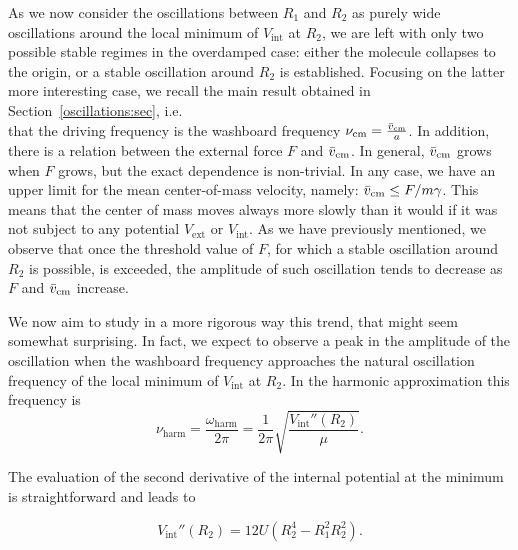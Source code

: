 
As we now consider the oscillations between $R_1$ and $R_2$ as purely wide oscillations around the local minimum of $V_\text{int}$ at $R_2$, we are left with only two possible stable regimes in the overdamped case: either the molecule collapses to the origin, or a stable oscillation around $R_2$ is established. Focusing on the latter more interesting case, we recall the main result obtained in Section~\ref{oscillations:sec}, i.e.\\ that the driving frequency is the washboard frequency $\nu_\text{cm} = \frac{\Bar{v}_\text{cm}}{a}$. In addition, there is a relation between the external force $F$ and $\Bar{v}_\text{cm}$. In general, $\Bar{v}_\text{cm}$ grows when $F$ grows, but the exact dependence is non-trivial. In any case, we have an upper limit for the mean center-of-mass velocity, namely: $\Bar{v}_\text{cm} \leq F/m\gamma$. This means that the center of mass moves always more slowly than it would if it was not subject to any potential $V_\text{ext}$ or $V_\text{int}$. As we have previously mentioned, we observe that once the threshold value of $F$, for which a stable oscillation around $R_2$ is possible, is exceeded, the amplitude of such oscillation tends to decrease as $F$ and $\Bar{v}_\text{cm}$ increase. 

We now aim to study in a more rigorous way this trend, that might seem somewhat surprising. In fact, we expect to observe a peak in the amplitude of the oscillation when the washboard frequency approaches the natural oscillation frequency of the local minimum of $V_\text{int}$ at $R_2$. In the harmonic approximation this frequency is
\begin{equation}
   \nu_\text{harm} = \frac{\omega_\text{harm}}{2\pi} = \frac{1}{2\pi}\sqrt{\frac{V_\text{int}''(R_2)}{\mu}}.
   \label{eq:nu_harm}
\end{equation}

The evaluation of the second derivative of the internal potential at the minimum is straightforward and leads to

\begin{equation}
    V_\text{int}''(R_2) = 12U\left(R_2^4-R_1^2R_2^2 \right).
\end{equation}

